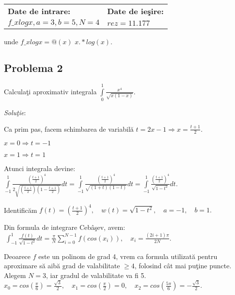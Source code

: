 \documentclass{exam}
\begin{document}
\begin{center}
	\begin{tabular}{| l | l |}
		\hline
		\textbf{Date de intrare:} & \textbf{Date de ieşire:} \\
		$f\_xlogx, a=3, b=5, N=4$
		                          &
		$rez =11.177 $
		\\
		\hline
	\end{tabular}
\end{center}

unde  $f\_xlogx=@(x)$  $x.*log(x).$


\subsection{Problema 2}

Calcula\c{t}i aproximativ integrala $\int\limits_0^1\frac{x^4}{\sqrt{x\left(1-x\right)}}$.

\textit{Solu\c{t}ie}:

Ca prim pas, facem schimbarea de variabil\u{a} $t=2x-1\Rightarrow x=\frac{t+1}{2}.$

$x=0\Rightarrow t=-1$

$x=1 \Rightarrow t=1$

Atunci integrala devine:
$ \int\limits_{-1}^1\frac{\left(\frac{t+1}{2}\right)^4}{2\sqrt{\left(\frac{t+1}{2}\right)\left(1-\frac{t+1}{2}\right)}}dt=\int\limits_{-1}^1\frac{\left(\frac{t+1}{2}\right)^4}{\sqrt{(1+t)(1-t)}}dt=\int\limits_{-1}^1\frac{\left(\frac{t+1}{2}\right)^4}{\sqrt{1-t^2}}dt. $

Identific\u{a}m $ f(t)=\left(\frac{t+1}{2}\right)^4, \quad w(t)=\sqrt{1-t^2}, \quad a=-1, \quad b=1. $

Din formula de integrare Ceb\^{a}\c{s}ev, avem:
$ \ \displaystyle \int_{-1}^1 \frac{f\left(t\right)}{\sqrt{1 - t^2}} dt = \frac{\pi}{N} \sum_{i = 0}^{N-1} f\left(cos(x_i)\right), \quad x_i= \frac{\left(2i + 1\right) \pi}{2N}. $

Deoarece $f$ este un polinom de grad 4, vrem ca formula utilizat\u{a} pentru aproximare s\u{a} aib\u{a} grad de valabilitate $\geq 4$, folosind c\^{a}t mai pu\c{t}ine puncte. Alegem $N=3$, iar gradul de valabilitate va fi 5. \\

$ x_0=cos \left(\frac{\pi}{6}\right)=\frac{\sqrt{3}}{2}, \quad x_1=cos \left(\frac{\pi}{2}\right)=0, \quad x_2=cos \left(\frac{5\pi}{6}\right)=-\frac{\sqrt{3}}{2}. $ \\
\end{document}
